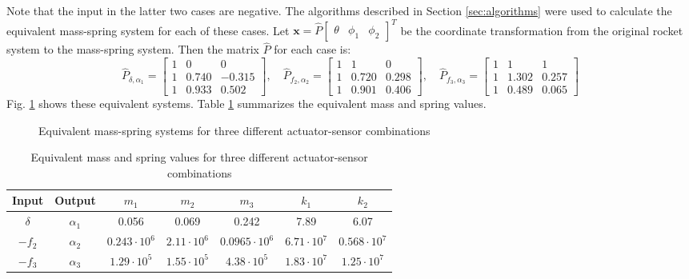 \documentclass{mbd_fullpaper}
\begin{document}
Note that the input in the latter two cases are negative.
The algorithms described in Section \ref{sec:algorithms} were used to calculate the equivalent mass-spring system for each of these cases.
Let $\mathbf{x} = \hat{P} \begin{bmatrix}\theta & \phi_1 & \phi_2 \end{bmatrix}^T $ be the coordinate transformation from the original rocket system to the mass-spring system.
Then the matrix $\hat{P}$ for each case is:
\begin{equation}
\hat{P}_{\delta,\alpha_1} =
\begin{bmatrix} 1 & 0 & 0 \\
1 & 0.740 & -0.315 \\
1 & 0.933 & 0.502 \end{bmatrix}
, \quad
\hat{P}_{f_2,\alpha_2} = 
\begin{bmatrix} 1 & 1 & 0 \\
1 & 0.720 & 0.298 \\
1 & 0.901 & 0.406 \end{bmatrix}
, \quad
\hat{P}_{f_3,\alpha_3} = 
\begin{bmatrix} 1 & 1 & 1 \\
1 & 1.302 & 0.257 \\
1 & 0.489 & 0.065 \end{bmatrix}
\end{equation}
Fig. \ref{fig:rocket-trans} shows these equivalent systems.
Table \ref{tab:equiv_vals} summarizes the equivalent mass and spring values.
\begin{figure}[h]
  \begin{center}
    
    \caption{Equivalent mass-spring systems for three different actuator-sensor combinations \label{fig:rocket-trans}}
  \end{center}
\end{figure}
\renewcommand{\arraystretch}{1.5}
\begin{table}[!ht]
  \begin{center}
    \caption{Equivalent mass and spring values for three different actuator-sensor combinations \label{tab:equiv_vals}}
    \vspace{1mm}
    \begin{tabular}{ ccccccc }
	\hline
           Input & Output & $m_1$ & $m_2$ & $m_3$ & $k_1$ & $k_2$ \\
	\hline
      	$\delta$ & $\alpha_1$ & 0.056 & 0.069 & 0.242 & 7.89 & 6.07  \\
      	$-f_2$ & $\alpha_2$ & $0.243\cdot 10^6$ & $2.11\cdot 10^6$ & $0.0965\cdot 10^6$ & $6.71\cdot 10^7$ & $0.568\cdot 10^7$ \\
      	$-f_3$ & $\alpha_3$ & $1.29\cdot 10^5$ & $1.55\cdot 10^5$ & $4.38\cdot 10^5$ & $1.83\cdot 10^7$ & $1.25\cdot 10^7$ \\
    \end{tabular}
  \end{center}
\end{table}
\end{document}
